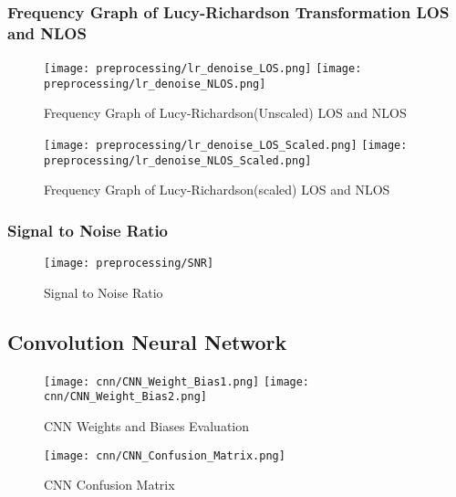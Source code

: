 \subsubsection{Frequency Graph of Lucy-Richardson Transformation LOS and NLOS}\label{frequency_graph_lr}

\begin{figure}[H] 
  \centering
  \texttt{[image: preprocessing/lr\_denoise\_LOS.png]}
  \texttt{[image: preprocessing/lr\_denoise\_NLOS.png]}
  \caption{Frequency Graph of Lucy-Richardson(Unscaled) LOS and NLOS}\label{fig:frequency_graph_lr}
\end{figure}

\begin{figure}[H] 
  \centering
  \texttt{[image: preprocessing/lr\_denoise\_LOS\_Scaled.png]}
  \texttt{[image: preprocessing/lr\_denoise\_NLOS\_Scaled.png]}
  \caption{Frequency Graph of Lucy-Richardson(scaled) LOS and NLOS}\label{fig:frequency_graph_lr_scaled}
\end{figure}

\subsubsection{Signal to Noise Ratio}\label{sur_visual}

\begin{figure}[H] %
	\centering %
	\texttt{[image: preprocessing/SNR]} %
	\caption{Signal to Noise Ratio}\label{fig:snr}
\end{figure}


\subsection{Convolution Neural Network}\label{cnn_visual}

\begin{figure}[H] 
  \centering
  \texttt{[image: cnn/CNN\_Weight\_Bias1.png]}
  \texttt{[image: cnn/CNN\_Weight\_Bias2.png]}
  \caption{CNN Weights and Biases Evaluation}\label{fig:cnn_weight_bias}
\end{figure}

\begin{figure}[H] 
  \centering
  \texttt{[image: cnn/CNN\_Confusion\_Matrix.png]}
  \caption{CNN Confusion Matrix}\label{fig:cnn_confusion_matrix}
\end{figure}

